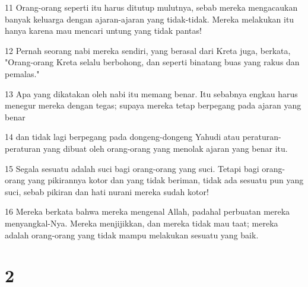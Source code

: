 \par 11 Orang-orang seperti itu harus ditutup mulutnya, sebab mereka mengacaukan banyak keluarga dengan ajaran-ajaran yang tidak-tidak. Mereka melakukan itu hanya karena mau mencari untung yang tidak pantas!
\par 12 Pernah seorang nabi mereka sendiri, yang berasal dari Kreta juga, berkata, "Orang-orang Kreta selalu berbohong, dan seperti binatang buas yang rakus dan pemalas."
\par 13 Apa yang dikatakan oleh nabi itu memang benar. Itu sebabnya engkau harus menegur mereka dengan tegas; supaya mereka tetap berpegang pada ajaran yang benar
\par 14 dan tidak lagi berpegang pada dongeng-dongeng Yahudi atau peraturan-peraturan yang dibuat oleh orang-orang yang menolak ajaran yang benar itu.
\par 15 Segala sesuatu adalah suci bagi orang-orang yang suci. Tetapi bagi orang-orang yang pikirannya kotor dan yang tidak beriman, tidak ada sesuatu pun yang suci, sebab pikiran dan hati nurani mereka sudah kotor!
\par 16 Mereka berkata bahwa mereka mengenal Allah, padahal perbuatan mereka menyangkal-Nya. Mereka menjijikkan, dan mereka tidak mau taat; mereka adalah orang-orang yang tidak mampu melakukan sesuatu yang baik.

\chapter{2}

